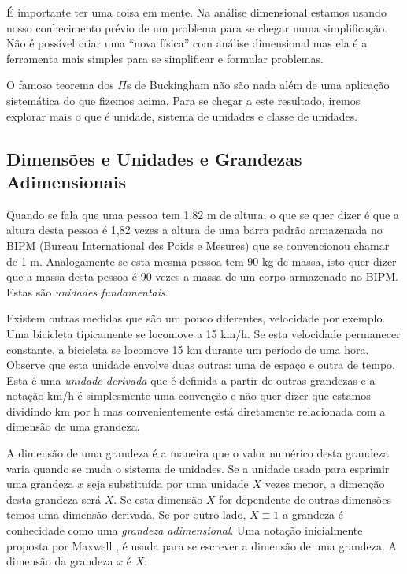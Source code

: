 É importante ter uma coisa em mente. Na análise dimensional estamos usando nosso conhecimento prévio de um problema para se chegar numa simplificação. Não é possível criar uma ``nova física'' com análise dimensional mas ela é a ferramenta mais simples para se simplificar e formular problemas.

O famoso teorema dos $\Pi$s de Buckingham não são nada além de uma aplicação sistemática do que fizemos acima. Para se chegar a este resultado, iremos explorar mais o que é unidade, sistema de unidades e classe de unidades.



\subsection{Dimensões e Unidades e Grandezas Adimensionais}

Quando se fala que uma pessoa tem 1,82 m de altura, o que se quer dizer é que a altura desta pessoa é 1,82 vezes a altura de uma barra padrão armazenada no BIPM (Bureau International des Poids e Mesures) que se convencionou chamar de 1 m. Analogamente se esta mesma pessoa tem 90 kg de massa, isto quer dizer que a massa desta pessoa é 90 vezes a massa de um corpo armazenado no BIPM. Estas são \emph{unidades fundamentais}. 

Existem outras medidas que são um pouco diferentes, velocidade por exemplo. Uma bicicleta tipicamente se locomove a 15 km/h. Se esta velocidade permanecer constante, a bicicleta se locomove 15 km durante um período de uma hora. Observe que esta unidade envolve duas outras: uma de espaço e outra de tempo. Esta é uma \emph{unidade derivada} que é definida a partir de outras grandezas e a notação km/h é simplesmente uma convenção e não quer dizer que estamos dividindo km por h mas convenientemente está diretamente relacionada com a dimensão de uma grandeza.

A dimensão de uma grandeza é a maneira que o valor numérico desta grandeza varia quando se muda o sistema de unidades. Se a unidade usada para esprimir uma grandeza $x$ seja substituída por uma unidade $X$ vezes menor, a dimenção desta grandeza será $X$. Se esta dimensão $X$ for dependente de outras dimensões temos uma dimensão derivada. Se por outro lado, $X\equiv 1$ a grandeza é conhecidade como uma \emph{grandeza adimensional}. Uma notação inicialmente proposta por Maxwell \cite{Maxwell1871}, é usada para se escrever a dimensão de uma grandeza. A dimensão da grandeza $x$ é $X$:


